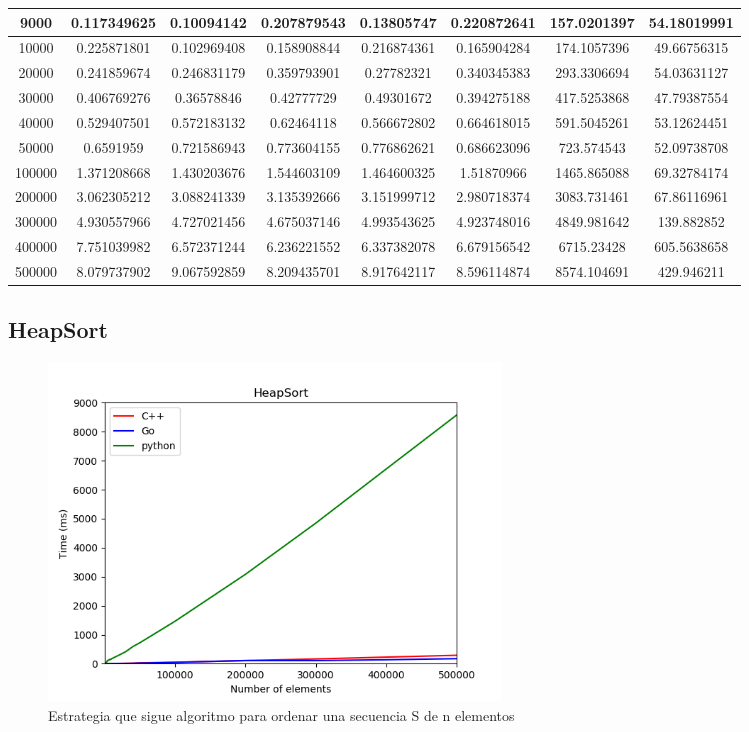 \documentclass{article}
\begin{document}
\begin{table}[]
\begin{tabular}{|c|c|c|c|c|c|c|c| }
9000	&0.117349625	&0.10094142	&0.207879543	&0.13805747	&0.220872641	&157.0201397	&54.18019991\\ \hline
10000	&0.225871801	&0.102969408	&0.158908844	&0.216874361	&0.165904284	&174.1057396	&49.66756315\\ \hline
20000	&0.241859674	&0.246831179	&0.359793901	&0.27782321	&0.340345383	&293.3306694	&54.03631127\\ \hline
30000	&0.406769276	&0.36578846	&0.42777729	&0.49301672	&0.394275188	&417.5253868	&47.79387554\\ \hline
40000	&0.529407501	&0.572183132	&0.62464118	&0.566672802	&0.664618015	&591.5045261	&53.12624451\\ \hline
50000	&0.6591959	&0.721586943	&0.773604155	&0.776862621	&0.686623096	&723.574543	&52.09738708\\ \hline
100000	&1.371208668	&1.430203676	&1.544603109	&1.464600325	&1.51870966	&1465.865088	&69.32784174\\ \hline
200000	&3.062305212	&3.088241339	&3.135392666	&3.151999712	&2.980718374	&3083.731461	&67.86116961\\ \hline
300000	&4.930557966	&4.727021456	&4.675037146	&4.993543625	&4.923748016	&4849.981642	&139.882852\\ \hline
400000	&7.751039982	&6.572371244	&6.236221552	&6.337382078	&6.679156542	&6715.23428	&605.5638658\\ \hline
500000	&8.079737902	&9.067592859	&8.209435701	&8.917642117	&8.596114874	&8574.104691	&429.946211\\ \hline
              
             \end{tabular}
    \end{table}          
              
    \subsection{HeapSort}
            \begin{figure}[h!]
            \centering
            \includegraphics[width=12cm]{img/HeapSort_1.png}
            \caption{Estrategia que sigue algoritmo para ordenar una secuencia S de n elementos}
            \label{fig:mergesort}
        \end {figure} 
        
\end{document}

